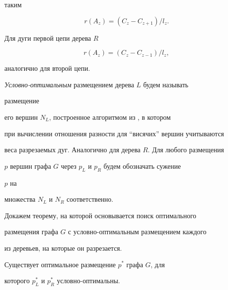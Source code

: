 таким


$$


r(A_z)=(C_z-C_{z+1})/l_z.


$$


Для дуги первой цепи дерева $R$


$$


r(A_z)=(C_z-C_{z-1})/l_z,


$$


аналогично для второй цепи.





{\em Условно-оптимальным} размещением дерева $L$ будем называть


размещение


его вершин $N_L$, построенное алгоритмом из \cite{Ado}, в котором


при вычислении отношения разности для ``висячих'' вершин учитываются


веса разрезаемых дуг. Аналогично для дерева $R$. Для любого размещения


$p$ вершин графа $G$ через $p_L$ и $p_R$ будем обозначать сужение


$p$ на


множества $N_L$ и $N_R$ соответственно.





Докажем теорему, на которой основывается поиск оптимального


размещения графа $G$ с условно-оптимальным размещением каждого


из деревьев, на которые он разрезается.





\begin{thm} Существует оптимальное размещение $p^*$ графа $G$, для


которого $p^*_L$ и $p^*_R$ условно-оптимальны.


\end{thm}





